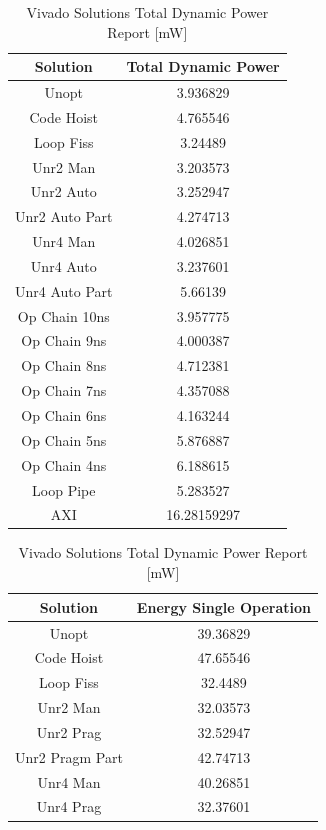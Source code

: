 \begin{table}[H]
	\centering
	\begin{minipage}[t]{0.45\linewidth}
		\centering
		\begin{tabular}{|c|c|}
			\hline
			\textbf{Solution} & \textbf{Total Dynamic Power} \\
			\hline
			Unopt & 3.936829 \\
			Code Hoist & 4.765546 \\
			Loop Fiss & 3.24489 \\
			Unr2 Man & 3.203573 \\
			Unr2 Auto & 3.252947 \\
			Unr2 Auto Part & 4.274713 \\
			Unr4 Man & 4.026851 \\
			Unr4 Auto & 3.237601 \\
			Unr4 Auto Part & 5.66139 \\
			Op Chain 10ns & 3.957775 \\
			Op Chain 9ns & 4.000387 \\
			Op Chain 8ns & 4.712381 \\
			Op Chain 7ns & 4.357088 \\
			Op Chain 6ns & 4.163244 \\
			Op Chain 5ns & 5.876887 \\
			Op Chain 4ns & 6.188615 \\
			Loop Pipe & 5.283527 \\
			AXI & 16.28159297 \\
			\hline
		\end{tabular}
		\caption{Vivado Solutions Total Dynamic Power Report [mW]}
		\label{tab:vivado-solutions-total-dynamic-power-report}
	\end{minipage}
	\hfill
	\centering
	\begin{minipage}[t]{0.45\linewidth}
		\centering
		\begin{tabular}{|c|c|}
			\hline
			\textbf{Solution} & \textbf{Energy Single Operation} \\
			\hline
			Unopt & 39.36829 \\
			Code Hoist & 47.65546 \\
			Loop Fiss & 32.4489 \\
			Unr2 Man & 32.03573 \\
			Unr2 Prag & 32.52947 \\
			Unr2 Pragm Part & 42.74713 \\
			Unr4 Man & 40.26851 \\
			Unr4 Prag & 32.37601 \\

\end{tabular}
\end{minipage}
\end{table}
